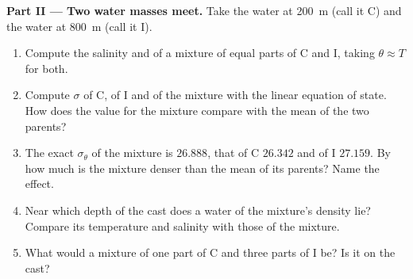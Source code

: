 \begin{problem}
\medskip
\noindent\textbf{Part II --- Two water masses meet.} Take the water at
\qty{200}{m} (call it C) and the water at \qty{800}{m} (call it I).
\begin{enumerate}[resume]
  \item Compute the salinity and  of a mixture of equal
        parts of C and I, taking $\theta \approx T$ for both.
  \item Compute $\sigma$ of C, of I and of the mixture with the linear
        equation of state. How does the value for the mixture compare with the
        mean of the two parents?
  \item The exact $\sigma_\theta$ of the mixture is $26.888$, that of C $26.342$
        and of I $27.159$. By how much is the mixture denser than the mean of its
        parents? Name the effect.
  \item Near which depth of the cast does a water of the mixture's density lie?
        Compare its temperature and salinity with those of the mixture.
  \item What would a mixture of one part of C and three parts of I be? Is it on
        the cast?
\end{enumerate}


\end{problem}
